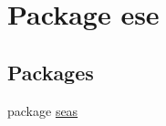 \hypertarget{namespaceese}{}\section{Package ese}
\label{namespaceese}
\subsection*{Packages}
\begin{DoxyCompactItemize}
\item 
package \hyperlink{namespaceese_1_1seas}{seas}
\end{DoxyCompactItemize}
